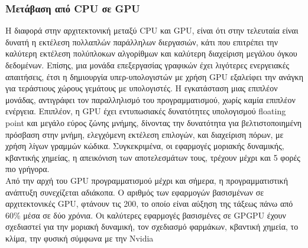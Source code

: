 \subsubsection{Μετάβαση από CPU σε GPU}
Η διαφορά στην αρχιτεκτονική μεταξύ CPU και GPU, είναι ότι στην τελευταία είναι δυνατή η εκτέλεση πολλαπλών παράλληλων διεργασιών, κάτι που επιτρέπει την καλύτερη εκτέλεση πολύπλοκων αλγορίθμων και καλύτερη διαχείριση μεγάλου όγκου δεδομένων. Επίσης, μια μονάδα επεξεργασίας γραφικών έχει λιγότερες ενεργειακές απαιτήσεις, έτσι η δημιουργία υπερ-υπολογιστών με χρήση GPU εξαλείφει την ανάγκη για τεράστιους χώρους γεμάτους με υπολογιστές. Η εγκατάσταση μιας επιπλέον μονάδας, αντιγράφει τον παραλληλισμό του προγραμματισμού, χωρίς καμία επιπλέον ενέργεια. Επιπλέον, η GPU έχει εντυπωσιακές δυνατότητες υπολογισμού floating point και μεγάλο εύρος ζώνης μνήμης, δίνοντας την δυνατότητα για βελτιστοποιημένη πρόσβαση στην μνήμη, ελεγχόμενη εκτέλεση επιλογών, και διαχείριση πόρων, με χρήση λίγων γραμμών κώδικα. Συγκεκριμένα, οι εφαρμογές μοριακής δυναμικής, κβαντικής χημείας, η απεικόνιση των αποτελεσμάτων τους, τρέχουν μέχρι και 5 φορές πιο γρήγορα. \\
Από την αρχή του GPU προγραμματισμού μέχρι και σήμερα, η προγραμματιστική ανάπτυξη συνεχίζεται αδιάκοπα. Ο αριθμός των εφαρμογών βασισμένων σε αρχιτεκτονικές GPU, φτάνουν τις 200, το οποίο είναι αύξηση της τάξεως πάνω από 60\% μέσα σε δύο χρόνια. Οι καλύτερες εφαρμογές βασισμένες σε GPGPU έχουν σχεδιαστεί για την μοριακή δυναμική, τον σχεδιασμό φαρμάκων, κβαντική χημεία, το κλίμα, την φυσική σύμφωνα με την Nvidia\cite{bioinformatics-2}
